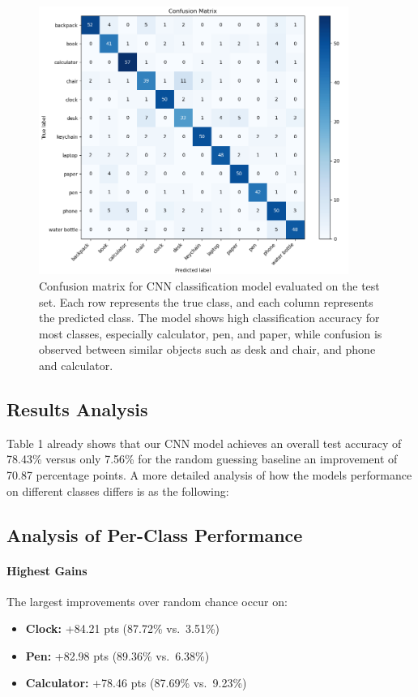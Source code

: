 \documentclass[10pt]{article}
\begin{document}
\begin{figure}[H]
    \centering
    \includegraphics[width=0.9\textwidth]{figures/confusion.png}
    \caption{Confusion matrix for CNN classification model evaluated on the test set. Each row represents the true class, and each column represents the predicted class. The model shows high classification accuracy for most classes, especially calculator, pen, and paper, while confusion is observed between similar objects such as desk and chair, and phone and calculator.}
    \label{fig:confusion}
\end{figure}

\subsection{Results Analysis}

Table 1 already shows that our CNN model achieves an overall test accuracy of 78.43\% versus only 7.56\% for the random guessing baseline an improvement of 
70.87 percentage points. A more detailed analysis of how the models performance on different classes differs is as the following:

\subsection{Analysis of Per-Class Performance}
\paragraph{Highest Gains}  
The largest improvements over random chance occur on:
\begin{itemize}
  \item \textbf{Clock:} +84.21 pts (87.72\% vs.\ 3.51\%)
  \item \textbf{Pen:}   +82.98 pts (89.36\% vs.\ 6.38\%)
  \item \textbf{Calculator:} +78.46 pts (87.69\% vs.\ 9.23\%)
\end{itemize}
\end{document}
